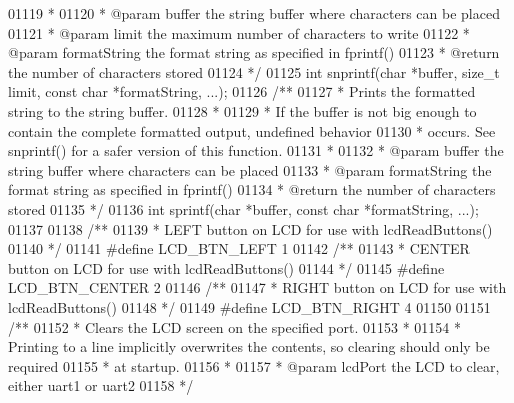 \begin{DoxyCode}
{{{{{{{{{01119 \textcolor{comment}{ *}
01120 \textcolor{comment}{ * @param buffer the string buffer where characters can be placed}
01121 \textcolor{comment}{ * @param limit the maximum number of characters to write}
01122 \textcolor{comment}{ * @param formatString the format string as specified in fprintf()}
01123 \textcolor{comment}{ * @return the number of characters stored}
01124 \textcolor{comment}{ */}
01125 \textcolor{keywordtype}{int} snprintf(\textcolor{keywordtype}{char} *buffer, size\_t limit, \textcolor{keyword}{const} \textcolor{keywordtype}{char} *formatString, ...);
01126 \textcolor{comment}{/**}
01127 \textcolor{comment}{ * Prints the formatted string to the string buffer.}
01128 \textcolor{comment}{ *}
01129 \textcolor{comment}{ * If the buffer is not big enough to contain the complete formatted output, undefined behavior}
01130 \textcolor{comment}{ * occurs. See snprintf() for a safer version of this function.}
01131 \textcolor{comment}{ *}
01132 \textcolor{comment}{ * @param buffer the string buffer where characters can be placed}
01133 \textcolor{comment}{ * @param formatString the format string as specified in fprintf()}
01134 \textcolor{comment}{ * @return the number of characters stored}
01135 \textcolor{comment}{ */}
01136 \textcolor{keywordtype}{int} sprintf(\textcolor{keywordtype}{char} *buffer, \textcolor{keyword}{const} \textcolor{keywordtype}{char} *formatString, ...);
01137 
01138 \textcolor{comment}{/**}
01139 \textcolor{comment}{ * LEFT button on LCD for use with lcdReadButtons()}
01140 \textcolor{comment}{ */}
01141 \textcolor{preprocessor}{#}\textcolor{preprocessor}{define} \textcolor{preprocessor}{LCD\_BTN\_LEFT} 1
01142 \textcolor{comment}{/**}
01143 \textcolor{comment}{ * CENTER button on LCD for use with lcdReadButtons()}
01144 \textcolor{comment}{ */}
01145 \textcolor{preprocessor}{#}\textcolor{preprocessor}{define} \textcolor{preprocessor}{LCD\_BTN\_CENTER} 2
01146 \textcolor{comment}{/**}
01147 \textcolor{comment}{ * RIGHT button on LCD for use with lcdReadButtons()}
01148 \textcolor{comment}{ */}
01149 \textcolor{preprocessor}{#}\textcolor{preprocessor}{define} \textcolor{preprocessor}{LCD\_BTN\_RIGHT} 4
01150 
01151 \textcolor{comment}{/**}
01152 \textcolor{comment}{ * Clears the LCD screen on the specified port.}
01153 \textcolor{comment}{ *}
01154 \textcolor{comment}{ * Printing to a line implicitly overwrites the contents, so clearing should only be required}
01155 \textcolor{comment}{ * at startup.}
01156 \textcolor{comment}{ *}
01157 \textcolor{comment}{ * @param lcdPort the LCD to clear, either uart1 or uart2}
01158 \textcolor{comment}{ */}
}}}}}}}}}
\end{DoxyCode}
